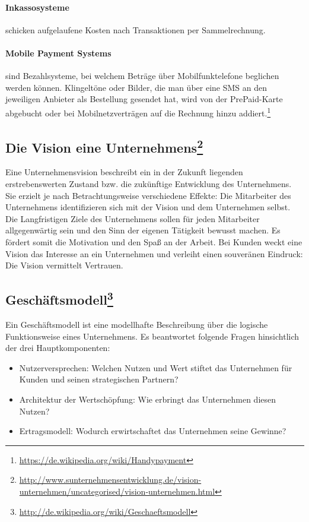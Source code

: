 \paragraph{Inkassosysteme} schicken aufgelaufene Kosten nach Transaktionen per Sa\-mmelrechnung. 

\paragraph{Mobile Payment Systems} sind Bezahlsysteme, bei welchem Beträge über Mobilfunktelefone beglichen werden können. Klingeltöne oder Bilder, die man über eine SMS an den jeweiligen Anbieter als Bestellung gesendet hat, wird von der PrePaid-Karte abgebucht oder bei Mobilnetzverträgen auf die Rechnung hinzu addiert.\footnote{\url{ https://de.wikipedia.org/wiki/Handypayment}}



\subsection[Die Vision eines Unternehmens]{Die Vision eine Unternehmens\footnote{\url{ http://www.sunternehmensentwicklung.de/vision-unternehmen/uncategorised/vision-unternehmen.html}}}

Eine Unternehmensvision beschreibt ein in der Zukunft liegenden erstrebenswerten Zustand bzw. die zukünftige Entwicklung des Unternehmens. Sie erzielt je nach Betrachtungsweise verschiedene Effekte: Die Mitarbeiter des Unternehmens identifizieren sich mit der Vision und dem Unternehmen selbst. Die Langfristigen Ziele des Unternehmens sollen für jeden Mitarbeiter allgegenwärtig sein und den Sinn der eigenen Tätigkeit bewusst machen. Es fördert somit die Motivation und den Spaß an der Arbeit. Bei Kunden weckt eine Vision das Interesse an ein Unternehmen und verleiht einen souveränen Eindruck: Die Vision vermittelt Vertrauen.
 

\subsection[Geschäftsmodell]{Geschäftsmodell\footnote{\url{ http://de.wikipedia.org/wiki/Geschaeftsmodell}}}

Ein Geschäftsmodell ist eine modellhafte Beschreibung über die logische Funktionsweise eines Unternehmens. Es beantwortet folgende Fragen hinsichtlich der drei Hauptkomponenten:
\begin{itemize}
	\item Nutzerversprechen: Welchen Nutzen und Wert stiftet das Unternehmen für Kunden und seinen strategischen Partnern?
	\item Architektur der Wertschöpfung: Wie erbringt das Unternehmen diesen Nutzen?
	\item Ertragsmodell: Wodurch erwirtschaftet das Unternehmen seine Gewinne?
\end{itemize}

